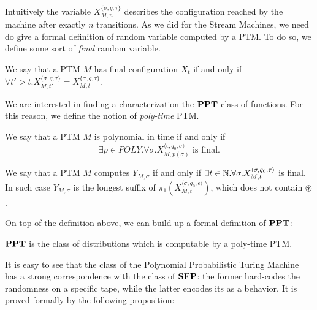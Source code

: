 \noindent
Intuitively the variable $X_{M, n}^{\{\sigma, q, \tau\}}$ describes
the configuration reached by the machine after exactly $n$ transitions.
%
As we did for the Stream Machines, we need do give a formal definition of random
variable computed by a PTM. To do so, we define some sort of
\emph{final} random variable.

\begin{defn}
We say that a PTM $M$ has final configuration $X_t$
if and only if $\forall t'>t.X_{M, t'}^{\{\sigma, q, \tau\}}=X_{M, t}^{\{\sigma, q, \tau\}}$.
\end{defn}

We are interested in finding a characterization the $\mathbf{PPT}$ class of functions.
For this reason, we define the notion of \emph{poly-time} PTM.

\begin{defn}
We say that a PTM $M$ is polynomial in time
if and only if
$$
\exists p\in POLY. \forall \sigma.X_{M, p(\sigma)}^{\langle \epsilon, q_0, \sigma\rangle}
\text{ is final}.
$$
\end{defn}

\begin{defn}
  \label{def:ptmY}
We say that a PTM $M$ computes $Y_{M,\sigma}$ if and only if
$\exists t \in \mathbb{N}. \forall \sigma.X_{M, t}^{\langle \sigma, q_0, \tau\rangle}$ is final.
In such case $Y_{M,\sigma}$ is the longest suffix of
$\pi_1(X_{M, t}^{\langle \sigma, q_0, \epsilon\rangle})$, which does not contain $\circledast$.
\end{defn}

On top of the definition above, we can build up a formal definition of $\mathbf{PPT}$:

\begin{defn}
\label{def:ppt}
$\mathbf{PPT}$ is the class of distributions which is computable by a poly-time PTM.
\end{defn}

It is easy to see that the class of the Polynomial Probabilistic Turing Machine has a strong correspondence with the class of $\mathbf{SFP}$: the former hard-codes the randomness on a specific tape, while the latter encodes its as a behavior. It is proved formally by the following proposition:

























